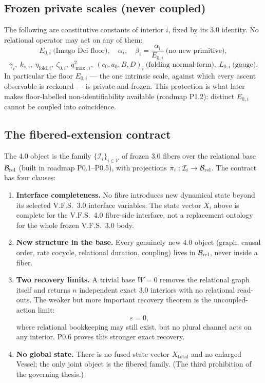 \documentclass[11pt,a4paper]{article}
\newcommand{\VFS}{\ensuremath{\mathrm{V.F.S.}}}
\newcommand{\Brel}{\ensuremath{\mathcal{B}_{\rm rel}}}
\theoremstyle{definition}
\theoremstyle{plain}
\theoremstyle{remark}
\begin{document}
\subsection{Frozen private scales (never coupled)}

The following are constitutive constants of interior $i$, fixed by its 3.0
identity. No relational operator may act on any of them:
\[
E_{0,i}\ \text{(Imago Dei floor)},\quad
\alpha_i,\quad
\beta_i=\frac{\alpha_i}{E_{0,i}}\ \text{(no new primitive)},
\]
\[
\gamma_i,\ k_{s,i},\ \eta_{\mathrm{fold},i},\ \zeta_{0,i},\ q^2_{\max,i},\
(c_0,a_0,B,D)_i\ \text{(folding normal-form)},\ L_{0,i}\ \text{(gauge)}.
\]
In particular the floor $E_{0,i}$ --- the one intrinsic scale, against which every
ascent observable is reckoned --- is private and frozen. This protection is what
later makes floor-labelled non-identifiability available (roadmap P1.2): distinct
$E_{0,i}$ cannot be coupled into coincidence.

\subsection{The fibered-extension contract}

The 4.0 object is the family $\{\mathcal I_i\}_{i\in\mathcal V}$ of frozen 3.0
fibers over the relational base $\Brel$ (built in roadmap P0.1--P0.5), with
projections $\pi_i:\mathcal I_i\to\Brel$. The contract has four clauses:
\begin{enumerate}[label=\textbf{IC\arabic*.},leftmargin=1.45cm]
\item \textbf{Interface completeness.} No fibre introduces new dynamical state beyond its selected \VFS\ 3.0 interface variables. The state vector $X_i$ above is complete for the \VFS\ 4.0 fibre-side interface, not a replacement ontology for the whole frozen \VFS\ 3.0 body.
\item \textbf{New structure in the base.} Every genuinely new 4.0 object (graph, causal order, rate cocycle, relational duration, coupling) lives in $\Brel$, never inside a fiber.
\item \textbf{Two recovery limits.}
A trivial base \(W=0\) removes the relational graph itself and returns \(n\)
independent exact 3.0 interiors with no relational read-outs. The weaker but more
important recovery theorem is the uncoupled-action limit:
\[
\varepsilon=0,
\]
where relational bookkeeping may still exist, but no plural channel acts on any
interior. P0.6 proves this stronger exact recovery.
\item \textbf{No global state.} There is no fused state vector $X_{\mathrm{total}}$ and no enlarged Vessel; the only joint object is the fibered family. (The third prohibition of the governing thesis.)
\end{enumerate}
\end{document}
